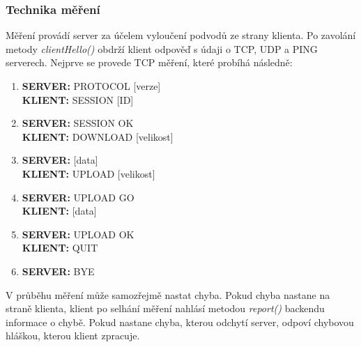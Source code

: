 \subsubsection*{Technika měření}
Měření provádí server za účelem vyloučení podvodů ze strany klienta. Po zavolání metody \emph{clientHello()} obdrží klient odpověď s údaji o TCP, UDP a PING serverech. Nejprve se provede TCP měření, které probíhá následně:

\begin{enumerate}
\item {\bf SERVER:} PROTOCOL [verze]
\\ {\bf KLIENT:} SESSION [ID]
\item {\bf SERVER:} SESSION OK
\\ {\bf KLIENT:} DOWNLOAD [velikost]
\item {\bf SERVER:} [data]
\\ {\bf KLIENT:} UPLOAD [velikost]
\item {\bf SERVER:} UPLOAD GO
\\ {\bf KLIENT:} [data]
\item {\bf SERVER:} UPLOAD OK
\\ {\bf KLIENT:} QUIT
\item {\bf SERVER:} BYE
\end{enumerate}
V průběhu měření může samozřejmě nastat chyba. Pokud chyba nastane  na straně klienta, klient po selhání měření nahlásí metodou \emph{report()} backendu informace o chybě. Pokud nastane chyba, kterou odchytí server, odpoví chybovou hláškou, kterou klient zpracuje.

